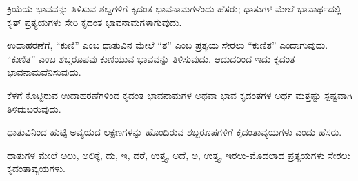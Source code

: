 
\indent ಕ್ರಿಯೆಯ ಭಾವವನ್ನು ತಿಳಿಸುವ ಶಬ್ದಗಳಿಗೆ ಕೃದಂತ ಭಾವನಾಮಗಳೆಂದು ಹೆಸರು; ಧಾತುಗಳ ಮೇಲೆ ಭಾವಾರ್ಥದಲ್ಲಿ ಕೃತ್‌ ಪ್ರತ್ಯಯಗಳು ಸೇರಿ ಕೃದಂತ ಭಾವನಾಮಗಳಾಗುವುದು.\par

\indent ಉದಾಹರಣೆಗೆ, “ಕುಣಿ” ಎಂಬ ಧಾತುವಿನ ಮೇಲೆ “ತ” ಎಂಬ ಪ್ರತ್ಯಯ ಸೇರಲು “ಕುಣಿತ” ಎಂದಾಗುವುದು. “ಕುಣಿತ” ಎಂಬ ಶಬ್ದರೂಪವು ಕುಣಿಯುವ ಭಾವವನ್ನು ತಿಳಿಸುವುದು. ಆದುದರಿಂದ ಇದು ಕೃದಂತ ಭಾವನಾಮವೆನಿಸುವುದು.\par

\begin{kbvrule}
\noindent\kbvbullet\hspace{0.5em}ಕೆಳಗೆ ಕೊಟ್ಟಿರುವ ಉದಾಹರಣೆಗಳಿಂದ ಕೃದಂತ ಭಾವನಾಮಗಳ ಅಥವಾ ಭಾವ ಕೃದಂತಗಳ ಅರ್ಥ ಮತ್ತಷ್ಟು ಸ್ಪಷ್ಟವಾಗಿ ತಿಳಿದುಬರುವುದು.
\end{kbvrule}

\vspace{5pt plus 4pt minus 1pt}
\vspace{5pt plus 4pt minus 1pt}


\indent ಧಾತುವಿನಿಂದ ಹುಟ್ಟಿ ಅವ್ಯಯದ ಲಕ್ಷಣಗಳನ್ನು ಹೊಂದಿರುವ ಶಬ್ದರೂಪಗಳಿಗೆ ಕೃದಂತಾವ್ಯಯಗಳು ಎಂದು ಹೆಸರು.\par

\indent ಧಾತುಗಳ ಮೇಲೆ ಅಲು, ಅಲಿಕ್ಕೆ, ದು, ಇ, ದರೆ, ಉತ್ತ್ಯ, ಅದೆ, ಅ, ಉತ್ತ್ಯ, ಇರಲು-ಮೊದಲಾದ ಪ್ರತ್ಯಯಗಳು ಸೇರಲು ಕೃದಂತಾವ್ಯಯಗಳು.\par
